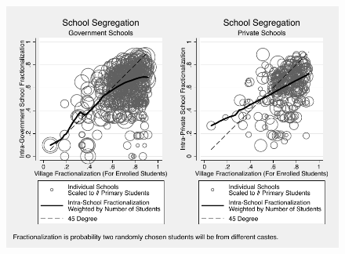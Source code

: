 \documentclass{beamer}
\begin{document}
\begin{frame}{}
	\begin{figure}[htb]
		\begin{center}		\includegraphics[scale=0.8]{graphs/intra_versus_intervillage_frac_combined.pdf}
		\end{center}
	\end{figure}
\end{frame}
\end{document}

